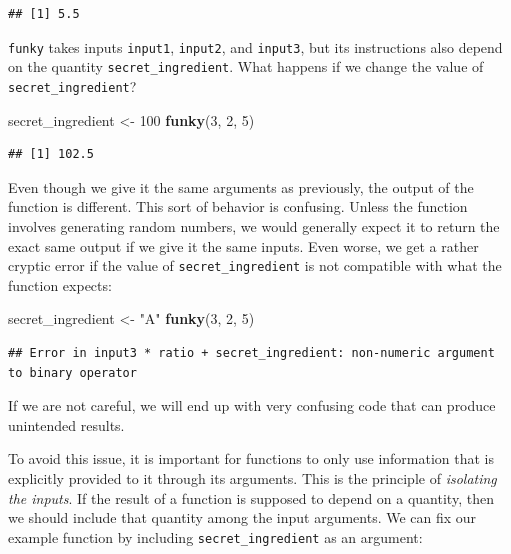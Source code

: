 \documentclass[
]{book}
\newenvironment{Shaded}{\begin{snugshade}}{\end{snugshade}}
\newcommand{\DecValTok}[1]{\textcolor[rgb]{0.00,0.00,0.81}{#1}}
\newcommand{\FunctionTok}[1]{\textcolor[rgb]{0.13,0.29,0.53}{\textbf{#1}}}
\newcommand{\NormalTok}[1]{#1}
\newcommand{\OtherTok}[1]{\textcolor[rgb]{0.56,0.35,0.01}{#1}}
\newcommand{\StringTok}[1]{\textcolor[rgb]{0.31,0.60,0.02}{#1}}
\begin{document}
\begin{verbatim}
## [1] 5.5
\end{verbatim}

\texttt{funky} takes inputs \texttt{input1}, \texttt{input2}, and \texttt{input3}, but its instructions also depend on the quantity \texttt{secret\_ingredient}.
What happens if we change the value of \texttt{secret\_ingredient}?

\begin{Shaded}
\begin{Highlighting}[]
\NormalTok{secret\_ingredient }\OtherTok{\textless{}{-}} \DecValTok{100}
\FunctionTok{funky}\NormalTok{(}\DecValTok{3}\NormalTok{, }\DecValTok{2}\NormalTok{, }\DecValTok{5}\NormalTok{)}
\end{Highlighting}
\end{Shaded}

\begin{verbatim}
## [1] 102.5
\end{verbatim}

Even though we give it the same arguments as previously, the output of the function is different.
This sort of behavior is confusing.
Unless the function involves generating random numbers, we would generally expect it to return the exact same output if we give it the same inputs.
Even worse, we get a rather cryptic error if the value of \texttt{secret\_ingredient} is not compatible with what the function expects:

\begin{Shaded}
\begin{Highlighting}[]
\NormalTok{secret\_ingredient }\OtherTok{\textless{}{-}} \StringTok{"A"}
\FunctionTok{funky}\NormalTok{(}\DecValTok{3}\NormalTok{, }\DecValTok{2}\NormalTok{, }\DecValTok{5}\NormalTok{)}
\end{Highlighting}
\end{Shaded}

\begin{verbatim}
## Error in input3 * ratio + secret_ingredient: non-numeric argument to binary operator
\end{verbatim}

If we are not careful, we will end up with very confusing code that can produce unintended results.

To avoid this issue, it is important for functions to only use information that is explicitly provided to it through its arguments.
This is the principle of \emph{isolating the inputs}.
If the result of a function is supposed to depend on a quantity, then we should include that quantity among the input arguments.
We can fix our example function by including \texttt{secret\_ingredient} as an argument:
\end{document}
